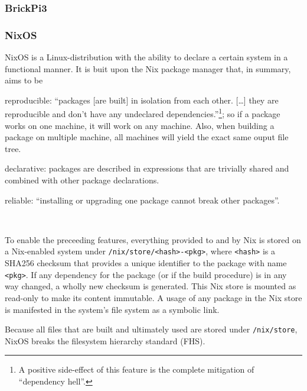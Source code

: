 \subsubsection{BrickPi3}


\subsubsection{NixOS}
NixOS is a Linux-distribution with the ability to declare a certain system in a functional manner.
It is buit upon the Nix package manager that, in summary, aims to be
\begin{inline-enum}
\item reproducible:
  ``packages [are built] in isolation from each other. [\ldots] they are reproducible and don't have any undeclared dependencies.''\footnote{A positive side-effect of this feature is the complete mitigation of ``dependency hell''.};
  so if a package works on one machine, it will work on any machine.
  Also, when building a package on multiple machine, all machines will yield the exact same ouput file tree.
\item declarative:
  packages are described in expressions that are trivially shared and combined with other package declarations.
\item reliable:
  ``installing or upgrading one package cannot break other packages''.
\end{inline-enum}~\parencite{nixos.org}

To enable the preceeding features, everything provided to and by Nix is stored on a Nix-enabled system under \texttt{/nix/store/<hash>-<pkg>},
where \texttt{<hash>} is a SHA256 checksum that provides a unique identifier to the package with name \texttt{<pkg>}.
If any dependency for the package (or if the build procedure) is in any way changed, a wholly new checksum is generated.
This Nix store is mounted as read-only to make its content immutable.
A usage of any package in the Nix store is manifested in the system's file system as a symbolic link.

Because all files that are built and ultimately used are stored under \texttt{/nix/store}, NixOS breaks the filesystem hierarchy standard (FHS).

